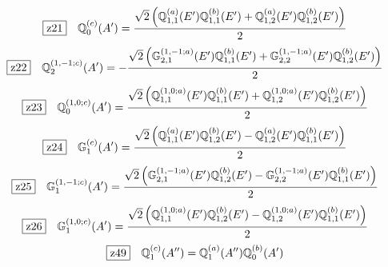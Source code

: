 \documentclass[fleqn,10pt,landscape]{jsarticle}
\begin{document}
\begin{dmath*}
\hspace*{3mm}\fbox{z21}\quad \mathbb{Q}_{0}^{(c)}(A^{\prime})=\frac{\sqrt{2} \left(\mathbb{Q}_{1,1}^{(a)}(E^{\prime}) \mathbb{Q}_{1,1}^{(b)}(E^{\prime}) + \mathbb{Q}_{1,2}^{(a)}(E^{\prime}) \mathbb{Q}_{1,2}^{(b)}(E^{\prime})\right)}{2}
\end{dmath*}
\begin{dmath*}
\hspace*{3mm}\fbox{z22}\quad \mathbb{Q}_{2}^{(1,-1;c)}(A^{\prime})=- \frac{\sqrt{2} \left(\mathbb{G}_{2,1}^{(1,-1;a)}(E^{\prime}) \mathbb{Q}_{1,1}^{(b)}(E^{\prime}) + \mathbb{G}_{2,2}^{(1,-1;a)}(E^{\prime}) \mathbb{Q}_{1,2}^{(b)}(E^{\prime})\right)}{2}
\end{dmath*}
\begin{dmath*}
\hspace*{3mm}\fbox{z23}\quad \mathbb{Q}_{0}^{(1,0;c)}(A^{\prime})=\frac{\sqrt{2} \left(\mathbb{Q}_{1,1}^{(1,0;a)}(E^{\prime}) \mathbb{Q}_{1,1}^{(b)}(E^{\prime}) + \mathbb{Q}_{1,2}^{(1,0;a)}(E^{\prime}) \mathbb{Q}_{1,2}^{(b)}(E^{\prime})\right)}{2}
\end{dmath*}
\begin{dmath*}
\hspace*{3mm}\fbox{z24}\quad \mathbb{G}_{1}^{(c)}(A^{\prime})=\frac{\sqrt{2} \left(\mathbb{Q}_{1,1}^{(a)}(E^{\prime}) \mathbb{Q}_{1,2}^{(b)}(E^{\prime}) - \mathbb{Q}_{1,2}^{(a)}(E^{\prime}) \mathbb{Q}_{1,1}^{(b)}(E^{\prime})\right)}{2}
\end{dmath*}
\begin{dmath*}
\hspace*{3mm}\fbox{z25}\quad \mathbb{G}_{1}^{(1,-1;c)}(A^{\prime})=\frac{\sqrt{2} \left(\mathbb{G}_{2,1}^{(1,-1;a)}(E^{\prime}) \mathbb{Q}_{1,2}^{(b)}(E^{\prime}) - \mathbb{G}_{2,2}^{(1,-1;a)}(E^{\prime}) \mathbb{Q}_{1,1}^{(b)}(E^{\prime})\right)}{2}
\end{dmath*}
\begin{dmath*}
\hspace*{3mm}\fbox{z26}\quad \mathbb{G}_{1}^{(1,0;c)}(A^{\prime})=\frac{\sqrt{2} \left(\mathbb{Q}_{1,1}^{(1,0;a)}(E^{\prime}) \mathbb{Q}_{1,2}^{(b)}(E^{\prime}) - \mathbb{Q}_{1,2}^{(1,0;a)}(E^{\prime}) \mathbb{Q}_{1,1}^{(b)}(E^{\prime})\right)}{2}
\end{dmath*}
\begin{dmath*}
\hspace*{3mm}\fbox{z49}\quad \mathbb{Q}_{1}^{(c)}(A^{\prime\prime})=\mathbb{Q}_{1}^{(a)}(A^{\prime\prime}) \mathbb{Q}_{0}^{(b)}(A^{\prime})
\end{dmath*}
\end{document}
